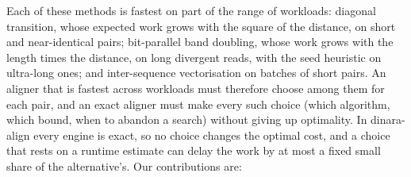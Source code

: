 Each of these methods is fastest on part of the range of workloads: diagonal transition, whose expected work grows with the square of the distance, on short and near-identical pairs; bit-parallel band doubling, whose work grows with the length times the distance, on long divergent reads, with the seed heuristic on ultra-long ones; and inter-sequence vectorisation on batches of short pairs. An aligner that is fastest across workloads must therefore choose among them for each pair, and an exact aligner must make every such choice (which algorithm, which bound, when to abandon a search) without giving up optimality. In dinara-align every engine is exact, so no choice changes the optimal cost, and a choice that rests on a runtime estimate can delay the work by at most a fixed small share of the alternative's. Our contributions are:

